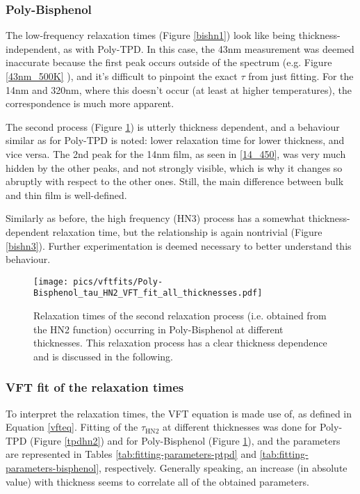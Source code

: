 \subsubsection{Poly-Bisphenol}
The low-frequency relaxation times (Figure \ref{bishn1}) look like being thickness-independent, as with Poly-TPD. In this case, the 43nm measurement was deemed inaccurate because the first peak occurs outside of the spectrum (e.g. Figure \ref{43nm_500K} %
), and it's difficult to pinpoint the exact $\tau$ from just fitting.
For the 14nm and 320nm, where this doesn't occur (at least at higher temperatures), the correspondence is much more apparent.

The second process (Figure \ref{bishn2}) is utterly thickness dependent, and a behaviour similar as for Poly-TPD is noted: lower relaxation time for lower thickness, and vice versa. The 2nd peak for the 14nm film, as seen in \ref{14_450}, was very much hidden by the other peaks, and not strongly visible, which is why it changes so abruptly with respect to the other ones. Still, the main difference between bulk and thin film is well-defined.

Similarly as before, the high frequency (HN3) process has a somewhat thickness-dependent relaxation time, but the relationship is again nontrivial (Figure \ref{bishn3}). Further experimentation is deemed necessary to better understand this behaviour.

\begin{figure}[t]%
  \centering
  \texttt{[image: pics/vftfits/Poly-Bisphenol\_tau\_HN2\_VFT\_fit\_all\_thicknesses.pdf]}
  \caption{Relaxation times of the second relaxation process (i.e. obtained from the HN2 function) occurring in Poly-Bisphenol at different thicknesses. This relaxation process has a clear thickness dependence and is discussed in the following.}
  \label{bishn2}
\end{figure}%


\subsubsection{VFT fit of the relaxation times}
To interpret the relaxation times, the \ac{VFT} equation is made use of, as defined in Equation \ref{vfteq}. Fitting of the $\tau_{\text{HN2}}$ at different thicknesses was done for Poly-TPD (Figure \ref{tpdhn2}) and for Poly-Bisphenol (Figure \ref{bishn2}), and the parameters are represented in Tables \ref{tab:fitting-parameters-ptpd} and \ref{tab:fitting-parameters-bisphenol}, respectively.
Generally speaking, an increase (in absolute value) with thickness seems to correlate all of the obtained parameters.

